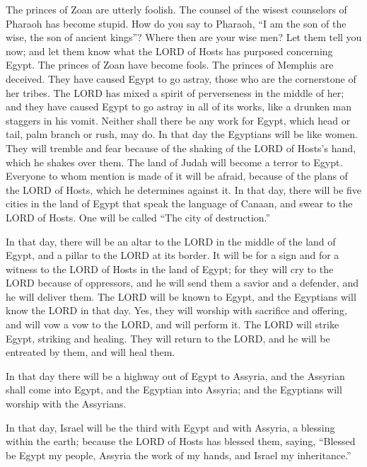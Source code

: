 \myverse{}The princes of Zoan are utterly foolish. The counsel of the
wisest counselors of Pharaoh has become stupid. How do you say to Pharaoh, “I am the son of the wise,
the son of ancient kings”?
\myverse{}Where then are your wise men? Let them tell you now; and let them know what
the LORD of Hosts has purposed concerning Egypt.
\myverse{}The princes of Zoan have become fools. The princes of Memphis are deceived.
They have caused Egypt to go astray, those who are the cornerstone of her tribes.
\myverse{}The LORD has mixed a spirit of perverseness in the middle of her; and they
have caused Egypt to go astray in all of its works, like a drunken man staggers in his vomit.
\myverse{}Neither shall there be any work for Egypt, which head or tail, palm branch
or rush, may do.
\myverse{}In that day the Egyptians will be like women. They will tremble and fear
because of the shaking of the LORD of Hosts’s hand, which he shakes over them.
\myverse{}The land of Judah will become a terror to Egypt. Everyone to whom mention
is made of it will be afraid, because of the plans of the LORD of Hosts, which he determines against it.
\myverse{}In that day, there will be five cities in the land of Egypt that speak the
language of Canaan, and swear to the LORD of Hosts. One will be called “The city of destruction.”

\myverse{}In that day, there will be an altar to the LORD in the middle
of the land of Egypt, and a pillar to the LORD at its border.
\myverse{}It will be for a sign and for a witness to the LORD of Hosts in the land
of Egypt; for they will cry to the LORD because of oppressors, and he will send them a savior and a defender,
and he will deliver them.
\myverse{}The LORD will be known to Egypt, and the Egyptians will know the LORD in
that day. Yes, they will worship with sacrifice and offering, and will vow a vow to the LORD, and will
perform it.
\myverse{}The LORD will strike Egypt, striking and healing. They will return to the
LORD, and he will be entreated by them, and will heal them.

\myverse{}In that day there will be a highway out of Egypt to Assyria,
and the Assyrian shall come into Egypt, and the Egyptian into Assyria; and the Egyptians will worship
with the Assyrians.

\myverse{}In that day, Israel will be the third with Egypt and with Assyria,
a blessing within the earth;
\myverse{}because the LORD of Hosts has blessed them, saying, “Blessed be Egypt my
people, Assyria the work of my hands, and Israel my inheritance.”


